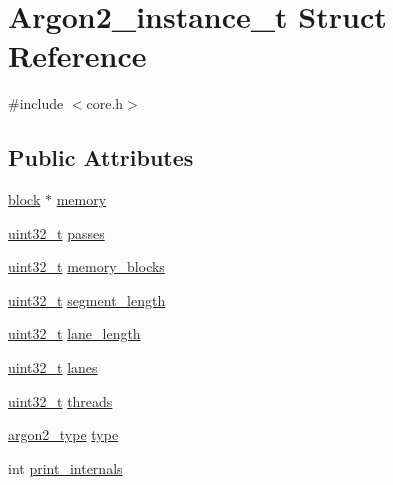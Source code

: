\hypertarget{struct_argon2__instance__t}{}\section{Argon2\+\_\+instance\+\_\+t Struct Reference}
\label{struct_argon2__instance__t}


{\ttfamily \#include $<$core.\+h$>$}

\subsection*{Public Attributes}
\begin{DoxyCompactItemize}
\item 
\hyperlink{core_8h_ace80c27428e237fe24f54ae915a36133}{block} $\ast$ \hyperlink{struct_argon2__instance__t_a7feaf5341041e1c7aca88eb093ad67a3}{memory}
\item 
\hyperlink{stdint_8h_a435d1572bf3f880d55459d9805097f62}{uint32\+\_\+t} \hyperlink{struct_argon2__instance__t_a2783db68ff7f7801616f7c78e319ffd5}{passes}
\item 
\hyperlink{stdint_8h_a435d1572bf3f880d55459d9805097f62}{uint32\+\_\+t} \hyperlink{struct_argon2__instance__t_a40e32466250c3eaa25458b89050f1d0d}{memory\+\_\+blocks}
\item 
\hyperlink{stdint_8h_a435d1572bf3f880d55459d9805097f62}{uint32\+\_\+t} \hyperlink{struct_argon2__instance__t_a027cbd7a67c433446811f3c0f00099be}{segment\+\_\+length}
\item 
\hyperlink{stdint_8h_a435d1572bf3f880d55459d9805097f62}{uint32\+\_\+t} \hyperlink{struct_argon2__instance__t_a91274f0e1d85a39d29d7ab90a44e4c79}{lane\+\_\+length}
\item 
\hyperlink{stdint_8h_a435d1572bf3f880d55459d9805097f62}{uint32\+\_\+t} \hyperlink{struct_argon2__instance__t_ad2f436030b823c86269c589d6a923120}{lanes}
\item 
\hyperlink{stdint_8h_a435d1572bf3f880d55459d9805097f62}{uint32\+\_\+t} \hyperlink{struct_argon2__instance__t_ae44c8933040075bc8b4fc3d15b170a2f}{threads}
\item 
\hyperlink{argon2_8h_af51eac9927f7f234943d076166aacf84}{argon2\+\_\+type} \hyperlink{struct_argon2__instance__t_a5632fb070b91ef79ed3a7f915b032d90}{type}
\item 
int \hyperlink{struct_argon2__instance__t_a475fcf721a2e26d5239b21eb5fd01375}{print\+\_\+internals}
\end{DoxyCompactItemize}


